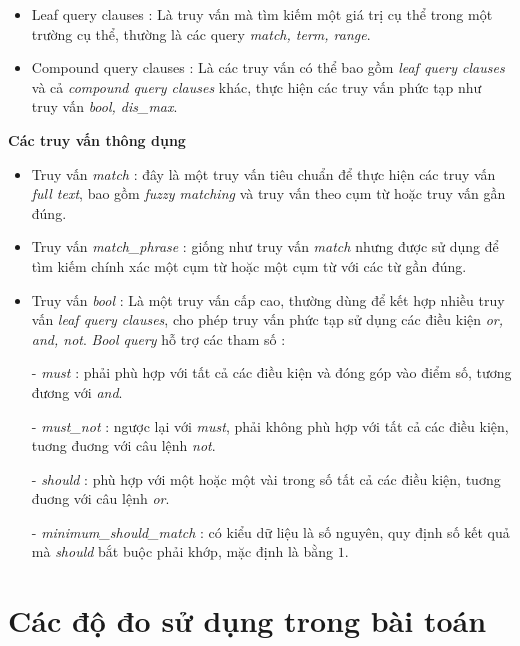 \begin{itemize}
    \item Leaf query clauses : Là truy vấn mà tìm kiếm một giá trị cụ thể trong một trường cụ thể, thường là các query \textit{match, term, range}.
    \item Compound query clauses : Là các truy vấn có thể bao gồm \textit{leaf query clauses} và cả \textit{compound query clauses} khác, thực hiện các truy vấn phức tạp như truy vấn \textit{ bool, dis\_max}. 
\end{itemize}
\textbf{Các truy vấn thông dụng}

\begin{itemize}
    \item Truy vấn \textit{match} : đây là một truy vấn tiêu chuẩn để thực hiện các truy vấn \textit{full text}, bao gồm \textit{fuzzy matching} và truy vấn theo cụm từ hoặc truy vấn gần đúng.  
    \item Truy vấn \textit{match\_phrase} : giống như truy vấn \textit{match} nhưng được sử dụng để tìm kiếm chính xác một cụm từ hoặc một cụm từ với các từ gần đúng.
    \item Truy vấn \textit{bool} : Là một truy vấn cấp cao, thường dùng để kết hợp nhiều truy vấn \textit{leaf query clauses}, cho phép truy vấn phức tạp sử dụng các điều kiện \textit{or, and, not}. \textit{Bool query} hỗ trợ các tham số :
    
        \hspace{1cm} - \textit{must} : phải phù hợp với tất cả các điều kiện và đóng góp vào điểm số, tương đương với \textit{and}.
        
        \hspace{1cm} - \textit{must\_not} : ngược lại với \textit{must}, phải không phù hợp với tất cả các điều kiện, tuơng đuơng với câu lệnh\textit{ not}.
        
        \hspace{1cm} - \textit{should} : phù hợp với một hoặc một vài trong số tất cả các điều kiện, tuơng đuơng với câu lệnh \textit{ or}.
        
        \hspace{1cm} - \textit{minimum\_should\_match} : có kiểu dữ liệu là số nguyên, quy định số kết quả mà \textit{should} bắt buộc phải khớp, mặc định là bằng $1$.
        
\end{itemize}

\section{Các độ đo sử dụng trong bài toán}
